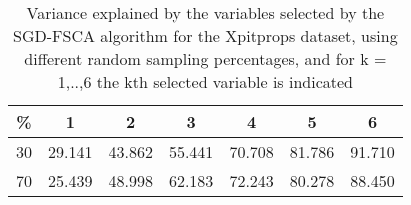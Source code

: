 \begin{table}
	\begin{center}
		\begin{tabular}{c c c c c c c}
			\% & 1 & 2 & 3 & 4 & 5 & 6 \\
			\hline
			30 & 29.141 & 43.862 & 55.441 & 70.708 & 81.786 & 91.710 \\
			70 & 25.439 & 48.998 & 62.183 & 72.243 & 80.278 & 88.450 \\
		\end{tabular}
	\end{center}
	\caption{Variance explained by the variables selected by the SGD-FSCA algorithm for the Xpitprops dataset, using different random sampling percentages, and for k = 1,..,6 the kth selected variable is indicated}
\end{table}